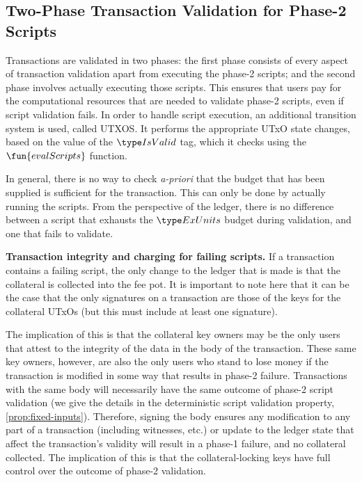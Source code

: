 \subsection{Two-Phase Transaction Validation for Phase-2 Scripts}
\label{sec:two-phase}

Transactions are validated in two phases:
the first phase consists of every aspect of transaction validation apart from executing the phase-2 scripts; and
the second phase involves actually executing those scripts.
This ensures that users pay for the computational resources that are needed to validate phase-2 scripts, even
if script validation fails. %
In order to handle script execution, an additional transition system is used, called UTXOS.
It performs the appropriate UTxO state changes, based on the
value of the $\IsValid$ tag, which it checks using the $\fun{evalScripts}$ function.

In general, there is no way to check \emph{a-priori} that the budget that has been supplied is sufficient for the transaction.
This can only be done by actually running the scripts. From the perspective of the ledger, there is no difference
between a script that exhausts the $\ExUnits$ budget during validation, and one that fails to validate.

\textbf{Transaction integrity and charging for failing scripts.}
If a transaction contains a failing script, the only change to the ledger that is made
is that the collateral is collected into the fee pot. It is important to note here
that it can be the case that the only signatures on a transaction are those
of the keys for the collateral UTxOs (but this must include at least one signature).

The implication of this is that the collateral key owners may be the only
users that attest to the integrity of the data in the body of the transaction. These
same key owners, however, are also the only users who stand to lose money if the
transaction is modified in some way that results in phase-2 failure.
Transactions with the same body will necessarily have the same outcome of phase-2
script validation (we give the details in the deterministic script validation property, \ref{prop:fixed-inputs}).
Therefore, signing the body ensures any modification to any part of a transaction (including
witnesses, etc.) or update to the ledger state that affect the transaction's validity will result in a phase-1 failure,
and no collateral collected. The implication of this is that
the collateral-locking keys have full control over the outcome of phase-2 validation.


